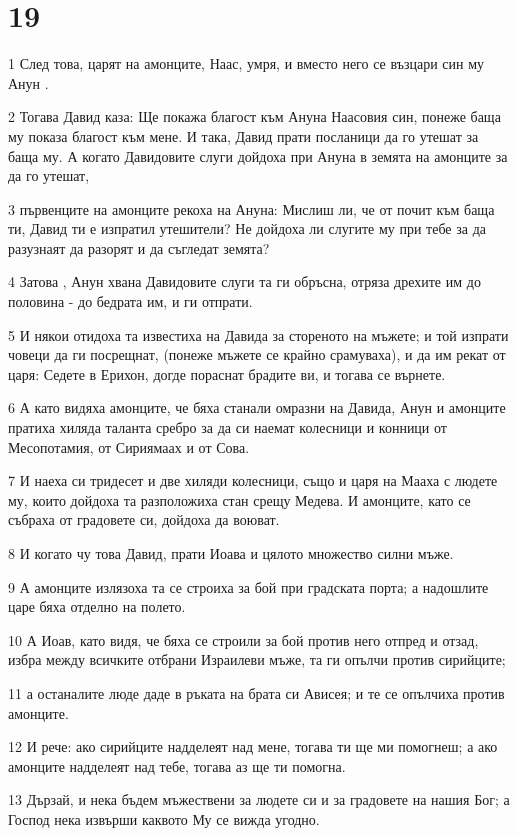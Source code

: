 \chapter{19}

\par 1 След това, царят на амонците, Наас, умря, и вместо него се възцари син му Анун .
\par 2 Тогава Давид каза: Ще покажа благост към Ануна Наасовия син, понеже баща му показа благост към мене. И така, Давид прати посланици да го утешат за баща му. А когато Давидовите слуги дойдоха при Ануна в земята на амонците за да го утешат,
\par 3 първенците на амонците рекоха на Ануна: Мислиш ли, че от почит към баща ти, Давид ти е изпратил утешители? Не дойдоха ли слугите му при тебе за да разузнаят да разорят и да съгледат земята?
\par 4 Затова , Анун хвана Давидовите слуги та ги обръсна, отряза дрехите им до половина - до бедрата им, и ги отпрати.
\par 5 И някои отидоха та известиха на Давида за стореното на мъжете; и той изпрати човеци да ги посрещнат, (понеже мъжете се крайно срамуваха), и да им рекат от царя: Седете в Ерихон, догде пораснат брадите ви, и тогава се върнете.
\par 6 А като видяха амонците, че бяха станали омразни на Давида, Анун и амонците пратиха хиляда таланта сребро за да си наемат колесници и конници от Месопотамия, от Сириямаах и от Сова.
\par 7 И наеха си тридесет и две хиляди колесници, също и царя на Мааха с людете му, които дойдоха та разположиха стан срещу Медева. И амонците, като се събраха от градовете си, дойдоха да воюват.
\par 8 И когато чу това Давид, прати Иоава и цялото множество силни мъже.
\par 9 А амонците излязоха та се строиха за бой при градската порта; а надошлите царе бяха отделно на полето.
\par 10 А Иоав, като видя, че бяха се строили за бой против него отпред и отзад, избра между всичките отбрани Израилеви мъже, та ги опълчи против сирийците;
\par 11 а останалите люде даде в ръката на брата си Ависея; и те се опълчиха против амонците.
\par 12 И рече: ако сирийците надделеят над мене, тогава ти ще ми помогнеш; а ако амонците надделеят над тебе, тогава аз ще ти помогна.
\par 13 Дързай, и нека бъдем мъжествени за людете си и за градовете на нашия Бог; а Господ нека извърши каквото Му се вижда угодно.
